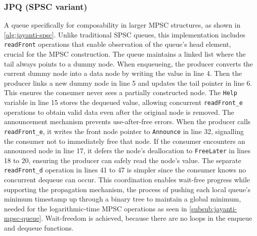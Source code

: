 \subsubsection{\ac{JPQ} (\ac{SPSC} variant)}\label{subsub:jayanti-spsc-queue}
A queue specifically for composability in larger \ac{MPSC} structures, as shown in \cref{alg:jayanti-spsc}. Unlike traditional \ac{SPSC} queues, this implementation includes \texttt{readFront} operations that enable observation of the queue's head element, crucial for the \ac{MPSC} construction. The queue maintains a linked list where the tail always points to a dummy node. When enqueueing, the producer converts the current dummy node into a data node by writing the value in line 4. Then the producer links a new dummy node in line 5 and updates the tail pointer in line 6. This ensures the consumer never sees a partially constructed node. The \texttt{Help} variable in line 15 stores the dequeued value, allowing concurrent \texttt{readFront\_e} operations to obtain valid data even after the original node is removed. The announcement mechanism prevents use-after-free errors. When the producer calls \texttt{readFront\_e}, it writes the front node pointer to \texttt{Announce} in line 32, signalling the consumer not to immediately free that node. If the consumer encounters an announced node in line 17, it defers the node's deallocation to \texttt{FreeLater} in lines 18 to 20, ensuring the producer can safely read the node's value. The separate \texttt{readFront\_d} operation in lines 41 to 47 is simpler since the consumer knows no concurrent dequeue can occur. This coordination enables wait-free progress while supporting the propagation mechanism, the process of pushing each local queue's minimum timestamp up through a binary tree to maintain a global minimum, needed for the logarithmic-time \ac{MPSC} operations as seen in \cref{subsub:jayanti-mpsc-queue}. Wait-freedom is achieved, because there are no loops in the enqueue and dequeue functions. \cite{JayantiLog}

